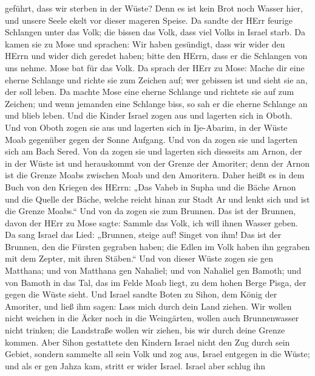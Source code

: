 geführt, dass wir sterben in der Wüste? Denn es ist kein Brot noch
Wasser hier, und unsere Seele ekelt vor dieser mageren Speise.
 Da sandte der HErr feurige Schlangen unter das Volk; die
bissen das Volk, dass viel Volks in Israel starb.  Da kamen
sie zu Mose und sprachen: Wir haben gesündigt, dass wir wider den HErrn
und wider dich geredet haben; bitte den HErrn, dass er die Schlangen von
uns nehme. Mose bat für das Volk.  Da sprach der HErr zu
Mose: Mache dir eine eherne Schlange und richte sie zum Zeichen auf; wer
gebissen ist und sieht sie an, der soll leben.  Da machte
Mose eine eherne Schlange und richtete sie auf zum Zeichen; und wenn
jemanden eine Schlange biss, so sah er die eherne Schlange an und blieb
leben.  Und die Kinder Israel zogen aus und lagerten sich
in Oboth.  Und von Oboth zogen sie aus und lagerten sich in
Ije-Abarim, in der Wüste Moab gegenüber gegen der Sonne Aufgang.
 Und von da zogen sie und lagerten sich am Bach Sered.
 Von da zogen sie und lagerten sich diesseits am Arnon, der
in der Wüste ist und herauskommt von der Grenze der Amoriter; denn der
Arnon ist die Grenze Moabs zwischen Moab und den Amoritern.
 Daher heißt es in dem Buch von den Kriegen des HErrn: „Das
Vaheb in Supha und die Bäche Arnon  und die Quelle der
Bäche, welche reicht hinan zur Stadt Ar und lenkt sich und ist die
Grenze Moabs.``  Und von da zogen sie zum Brunnen. Das ist
der Brunnen, davon der HErr zu Mose sagte: Sammle das Volk, ich will
ihnen Wasser geben.  Da sang Israel das Lied: „Brunnen,
steige auf! Singet von ihm!  Das ist der Brunnen, den die
Fürsten gegraben haben; die Edlen im Volk haben ihn gegraben mit dem
Zepter, mit ihren Stäben.`` Und von dieser Wüste zogen sie gen Matthana;
 und von Matthana gen Nahaliel; und von Nahaliel gen
Bamoth;  und von Bamoth in das Tal, das im Felde Moab
liegt, zu dem hohen Berge Pisga, der gegen die Wüste sieht.
 Und Israel sandte Boten zu Sihon, dem König der Amoriter,
und ließ ihm sagen:  Lass mich durch dein Land ziehen. Wir
wollen nicht weichen in die Äcker noch in die Weingärten, wollen auch
Brunnenwasser nicht trinken; die Landstraße wollen wir ziehen, bis wir
durch deine Grenze kommen.  Aber Sihon gestattete den
Kindern Israel nicht den Zug durch sein Gebiet, sondern sammelte all
sein Volk und zog aus, Israel entgegen in die Wüste; und als er gen
Jahza kam, stritt er wider Israel.  Israel aber schlug ihn
